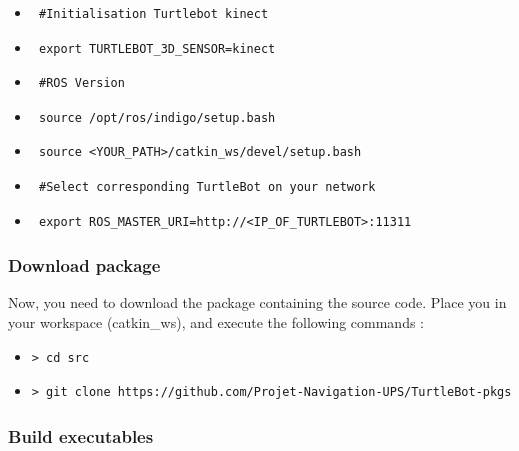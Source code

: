 \documentclass[10pt,a4paper]{article}
\begin{document}
\begin{itemize}
\item[]  \begin{verbatim} #Initialisation Turtlebot kinect \end{verbatim}
\item[]  \begin{verbatim} export TURTLEBOT_3D_SENSOR=kinect \end{verbatim}
\item[]  \begin{verbatim} #ROS Version \end{verbatim}
\item[]  \begin{verbatim} source /opt/ros/indigo/setup.bash \end{verbatim}
\item[]  \begin{verbatim} source <YOUR_PATH>/catkin_ws/devel/setup.bash \end{verbatim}
\item[]  \begin{verbatim} #Select corresponding TurtleBot on your network \end{verbatim}
\item[]  \begin{verbatim} export ROS_MASTER_URI=http://<IP_OF_TURTLEBOT>:11311  \end{verbatim}
\end{itemize}

\subsubsection{Download package}

Now, you need to download the package containing the source code. Place you in your workspace (catkin\_ws), and execute the following commands :

\begin{itemize}
\item[]  \begin{verbatim}> cd src \end{verbatim}
\item[]  \begin{verbatim}> git clone https://github.com/Projet-Navigation-UPS/TurtleBot-pkgs \end{verbatim}
\end{itemize}

\subsubsection{Build executables}
\end{document}
